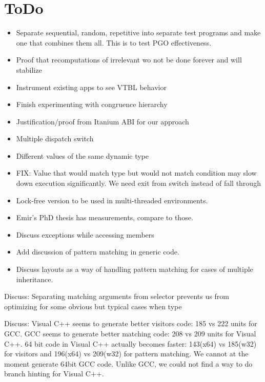 \documentclass[preprint]{sigplanconf}
\begin{document}
\section{ToDo} %
\begin{itemize}
\item Separate sequential, random, repetitive into separate test programs
      and make one that combines them all. This is to test PGO effectiveness.
\item Proof that recomputations of irrelevant wo not be done forever and will 
      stabilize
\item Instrument existing apps to see VTBL behavior
\item Finish experimenting with congruence hierarchy
\item Justification/proof from Itanium ABI for our approach
\item Multiple dispatch switch
\item Different values of the same dynamic type
\item FIX: Value that would match type but would not match condition may slow 
      down execution significantly. We need exit from switch instead of fall 
      through
\item Lock-free version to be used in multi-threaded environments.
\item Emir's PhD thesis has measurements, compare to those.
\item Discuss exceptions while accessing members
\item Add discussion of pattern matching in generic code.
\item Discuss layouts as a way of handling pattern matching for cases of 
      multiple inheritance.
\end{itemize}

Discuss: Separating matching arguments from selector prevents us from optimizing
for some obvious but typical cases when type 

Discuss:
Visual C++ seems to generate better visitors code: 185 vs 222 units for GCC.
GCC seems to generate better matching code: 208 vs 209 units for Visual C++.
64 bit code in Visual C++ actually becomes faster: 143(x64) vs 185(w32) for 
visitors and 196(x64) vs 209(w32) for pattern matching. We cannot at the moment 
generate 64bit GCC code.
Unlike GCC, we could not find a way to do branch hinting for Visual C++.
\end{document}
